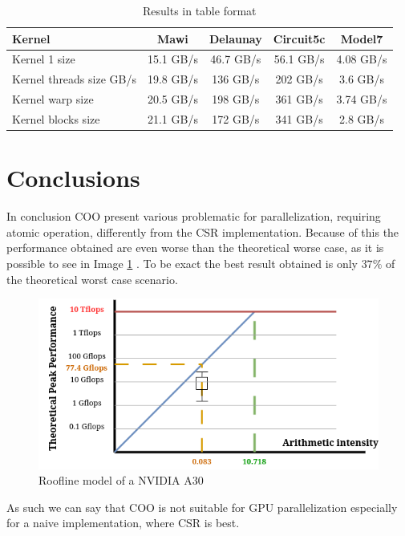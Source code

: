 \documentclass[conference]{IEEEtran}
\begin{document}
\begin{table}[hbt!]
	\centering
	\begin{adjustbox}{width=\columnwidth}
		\begin{tabular}{lcccc}
			\toprule
			\textbf{Kernel} & \textbf{Mawi} & \textbf{Delaunay} & \textbf{Circuit5c} & \textbf{Model7}\\
			\midrule
			Kernel 1 size & 15.1 GB/s & 46.7 GB/s & 56.1 GB/s & 4.08 GB/s\\
			Kernel threads size GB/s & 19.8 GB/s & 136 GB/s & 202 GB/s & 3.6 GB/s\\
			Kernel warp size & 20.5 GB/s & 198 GB/s & 361 GB/s & 3.74 GB/s\\
			Kernel blocks size & 21.1 GB/s & 172 GB/s & 341 GB/s & 2.8 GB/s\\
			\bottomrule
		\end{tabular}
	\end{adjustbox}
	\vspace{1em}

	\caption{Results in table format}
	\label{tab:gpu-results}
\end{table}

\FloatBarrier
\section{Conclusions}
In conclusion COO present various problematic for parallelization, requiring atomic operation, differently from the CSR implementation. Because of this the performance obtained are even worse than the theoretical worse case, as it is possible to see in Image \ref{fig:roofline} . To be exact the best result obtained is only $37\%$ of the theoretical worst case scenario.

\begin{figure}[hbt!]
	\centering
	\includegraphics[width=1\linewidth]{data_images/roofline}
	\caption{Roofline model of a NVIDIA A30}
	\label{fig:roofline}
\end{figure}

As such we can say that COO is not suitable for GPU parallelization especially for a naive implementation, where CSR is best.
\end{document}
